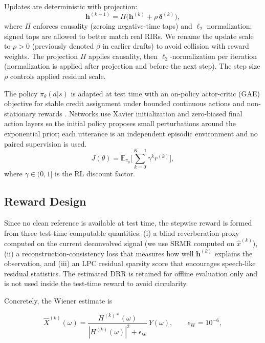 \documentclass[10pt,conference]{IEEEtran}
\begin{document}
Updates are deterministic with projection:
\begin{equation}
\label{eq:update_rl}
\mathbf{h}^{(k+1)}=\Pi\big(\mathbf{h}^{(k)}+\rho\,\boldsymbol{\delta}^{(k)}\big),
\end{equation}
where \(\Pi\) enforces causality (zeroing negative-time taps) and \(\ell_2\) normalization; signed taps are allowed to better match real RIRs. We rename the update scale to \(\rho>0\) (previously denoted \(\beta\) in earlier drafts) to avoid collision with reward weights. The projection \(\Pi\) applies causality, then \(\ell_2\)-normalization per iteration (normalization is applied after projection and before the next step). The step size \(\rho\) controls applied residual scale.

The policy \(\pi_\theta(a|s)\) is adapted at test time with an on-policy actor-critic (GAE) objective for stable credit assignment under bounded continuous actions and non-stationary rewards \cite{10771589}. Networks use Xavier initialization \cite{pmlr-v9-glorot10a} and zero-biased final action layers so the initial policy proposes small perturbations around the exponential prior; each utterance is an independent episodic environment and no paired supervision is used.
\begin{equation}
\label{eq:return}
J(\theta)=\mathbb{E}_{\pi_\theta}\Big[\sum_{k=0}^{K-1}\gamma^k r^{(k)}\Big],
\end{equation}
where \(\gamma\in(0,1]\) is the RL discount factor.

\subsection{Reward Design}
Since no clean reference is available at test time, the stepwise reward is formed from three test-time computable quantities: (i) a blind reverberation proxy computed on the current deconvolved signal (we use SRMR computed on \(\hat{x}^{(k)}\)), (ii) a reconstruction-consistency loss that measures how well \(\mathbf{h}^{(k)}\) explains the observation, and (iii) an LPC residual sparsity score that encourages speech-like residual statistics. The estimated DRR is retained for offline evaluation only and is not used inside the test-time reward to avoid circularity.

Concretely, the Wiener estimate is

\[
\hat{X}^{(k)}(\omega)=\frac{H^{(k)*}(\omega)}{|H^{(k)}(\omega)|^2+\epsilon_{\text{W}}}\,Y(\omega),\qquad \epsilon_{\text{W}}=10^{-6},
\]
\end{document}
